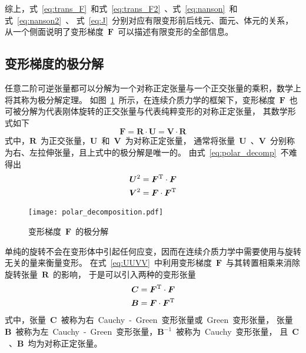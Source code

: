 综上，式~\eqref{eq:trans_F}~和式~\eqref{eq:trans_F2}~、式~\eqref{eq:nanson}~和式~\eqref{eq:nanson2}~、
式~\eqref{eq:J}~分别对应有限变形前后线元、面元、体元的关系，从一个侧面说明了变形梯度~$\bm{F}$~可以描述有限变形的全部信息。

\subsection{变形梯度的极分解}
任意二阶可逆张量都可以分解为一个对称正定张量与一个正交张量的乘积，数学上将其称为极分解定理\cite{polar}。
如图~\ref{fig:polar_decomp}~所示，在连续介质力学的框架下，变形梯度~$\bm{F}$~也可被分解为代表刚体旋转的正交张量与代表纯粹变形的对称正定张量，
其数学形式如下
\begin{equation}\label{eq:polar_decomp}
	\bm{F}=\bm{R} \cdot \bm{U} = \bm{V} \cdot \bm{R}
\end{equation}
式中，$\bm{R}$~为正交张量，$\bm{U}$~和~$\bm{V}$~为对称正定张量，
通常将张量~$\bm{U}$~、$\bm{V}$~分别称为右、左拉伸张量，且上式中的极分解是唯一的。
由式~\eqref{eq:polar_decomp}~不难得出
\begin{subequations}\label{eq:UUVV}
	\begin{align}
	\bm{U}^2 & =\bm{F}^{\mathrm{T}} \cdot \bm{F} \\
	\bm{V}^2 & =\bm{F} \cdot \bm{F}^{\mathrm{T}}
	\end{align}
\end{subequations}

\begin{figure}[!h]
	\centering
	\texttt{[image: polar\_decomposition.pdf]}
	\caption{变形梯度~$\bm{F}$~的极分解}
	\label{fig:polar_decomp}
\end{figure}

单纯的旋转不会在变形体中引起任何应变，因而在连续介质力学中需要使用与旋转无关的量来衡量变形。
在式~\eqref{eq:UUVV}~中利用变形梯度~$\bm{F}$~与其转置相乘来消除旋转张量~$\bm{R}$~的影响，
于是可以引入两种的变形张量 
\begin{subequations}
	\begin{align}
	\bm{C} & =\bm{F}^{\mathrm{T}} \cdot \bm{F} \label{eq:CeqFTF} \\
	\bm{B} & =\bm{F} \cdot \bm{F}^{\mathrm{T}} \label{eq:BeqFFT}
	\end{align}
\end{subequations}
式中，张量~$\bm{C}$~被称为右~Cauchy~-~Green~变形张量或~Green~变形张量，
张量~$\bm{B}$~被称为左~Cauchy~-~Green~变形张量，$\bm{B}^{-1}$~被称为~Cauchy~变形张量，
且~$\bm{C}$~、$\bm{B}$~均为对称正定张量。

